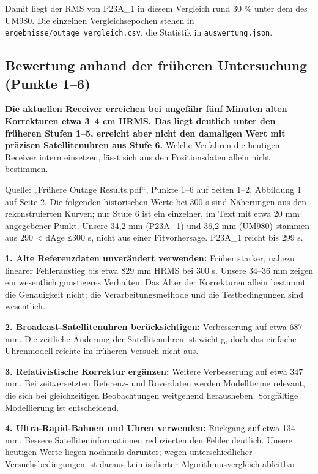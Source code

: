 \documentclass[11pt,a4paper]{article}
\begin{document}
Damit liegt der RMS von P23A\_1 in diesem Vergleich rund 30 \% unter dem des UM980. Die einzelnen Vergleichsepochen stehen in {\small\texttt{ergebnisse/\allowbreak{}outage\_\allowbreak{}vergleich.csv}}, die Statistik in {\small\texttt{auswertung.json}}.

\subsection{Bewertung anhand der früheren Untersuchung (Punkte 1–6)}

\textbf{Die aktuellen Receiver erreichen bei ungefähr fünf Minuten alten Korrekturen etwa 3–4 cm HRMS. Das liegt deutlich unter den früheren Stufen 1–5, erreicht aber nicht den damaligen Wert mit präzisen Satellitenuhren aus Stufe 6.} Welche Verfahren die heutigen Receiver intern einsetzen, lässt sich aus den Positionsdaten allein nicht bestimmen.

Quelle: „Frühere Outage Results.pdf“, Punkte 1–6 auf Seiten 1–2, Abbildung 1 auf Seite 2. Die folgenden historischen Werte bei 300 s sind Näherungen aus den rekonstruierten Kurven; nur Stufe 6 ist ein einzelner, im Text mit etwa 20 mm angegebener Punkt. Unsere 34,2 mm (P23A\_1) und 36,2 mm (UM980) stammen aus 290 < dAge ≤300 s, nicht aus einer Fitvorhersage. P23A\_1 reicht bis 299 s.

\textbf{1. Alte Referenzdaten unverändert verwenden:} Früher starker, nahezu linearer Fehleranstieg bis etwa 829 mm HRMS bei 300 s. Unsere 34–36 mm zeigen ein wesentlich günstigeres Verhalten. Das Alter der Korrekturen allein bestimmt die Genauigkeit nicht; die Verarbeitungsmethode und die Testbedingungen sind wesentlich.

\textbf{2. Broadcast-Satellitenuhren berücksichtigen:} Verbesserung auf etwa 687 mm. Die zeitliche Änderung der Satellitenuhren ist wichtig, doch das einfache Uhrenmodell reichte im früheren Versuch nicht aus.

\textbf{3. Relativistische Korrektur ergänzen:} Weitere Verbesserung auf etwa 347 mm. Bei zeitversetzten Referenz- und Roverdaten werden Modellterme relevant, die sich bei gleichzeitigen Beobachtungen weitgehend herausheben. Sorgfältige Modellierung ist entscheidend.

\textbf{4. Ultra-Rapid-Bahnen und Uhren verwenden:} Rückgang auf etwa 134 mm. Bessere Satelliteninformationen reduzierten den Fehler deutlich. Unsere heutigen Werte liegen nochmals darunter; wegen unterschiedlicher Versuchsbedingungen ist daraus kein isolierter Algorithmusvergleich ableitbar.
\end{document}

